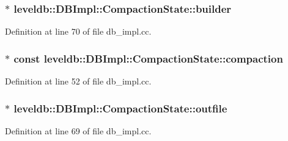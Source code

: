 \subsubsection[{builder}]{$\ast$ leveldb\+::\+D\+B\+Impl\+::\+Compaction\+State\+::builder}\label{structleveldb_1_1_d_b_impl_1_1_compaction_state_a5335b9d45bc03378219e3fbc366fce21}


Definition at line 70 of file db\+\_\+impl.\+cc.

\hypertarget{structleveldb_1_1_d_b_impl_1_1_compaction_state_a6b92e9f2249d5977b4801bdf47afed28}{}
\subsubsection[{compaction}]{$\ast$ const leveldb\+::\+D\+B\+Impl\+::\+Compaction\+State\+::compaction}\label{structleveldb_1_1_d_b_impl_1_1_compaction_state_a6b92e9f2249d5977b4801bdf47afed28}


Definition at line 52 of file db\+\_\+impl.\+cc.

\hypertarget{structleveldb_1_1_d_b_impl_1_1_compaction_state_a4c8e3de65efc30fdf33197d544a466f9}{}
\subsubsection[{outfile}]{$\ast$ leveldb\+::\+D\+B\+Impl\+::\+Compaction\+State\+::outfile}\label{structleveldb_1_1_d_b_impl_1_1_compaction_state_a4c8e3de65efc30fdf33197d544a466f9}


Definition at line 69 of file db\+\_\+impl.\+cc.

\hypertarget{structleveldb_1_1_d_b_impl_1_1_compaction_state_acce338739aafdfa40083ae3d5aacf24a}{}
